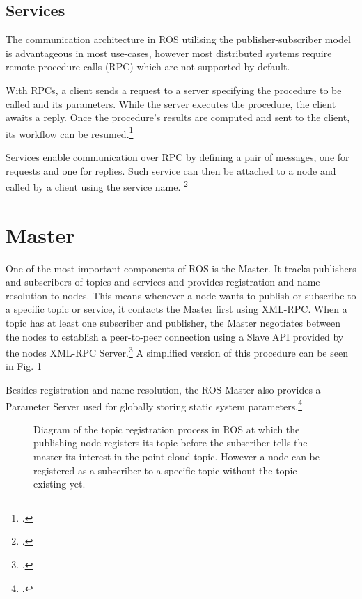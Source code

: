 \subsection{Services}
The communication architecture in ROS utilising the publisher-subscriber model is advantageous in most use-cases, however most distributed systems require remote procedure calls (RPC) which are not supported by default.

With RPCs, a client sends a request to a server specifying the procedure to be called and its parameters. While the server executes the procedure, the client awaits a reply. Once the procedure's results are computed and sent to the client, its workflow can be resumed.\footcite[Page 3]{rfc1831}

Services enable communication over RPC by defining a pair of messages, one for requests and one for replies. Such service can then be attached to a node and called by a client using the service name. \footcite{openSourceRoboticsFoundationServicesNodate}




\section{Master}
One of the most important components of ROS is the Master. It tracks publishers and subscribers of topics and services and provides registration and name resolution to nodes. This means whenever a node wants to publish or subscribe to a specific topic or service, it contacts the Master first using XML-RPC. When a topic has at least one subscriber and publisher, the Master negotiates between the nodes to establish a peer-to-peer connection using a Slave API provided by the nodes XML-RPC Server.\footcite{openSourceRoboticsFoundationMasterNodate} A simplified version of this procedure can be seen in Fig. \ref{fig:ros_master_reg}

Besides registration and name resolution, the ROS Master also provides a Parameter Server used for globally storing static system parameters.\footcite{openSourceRoboticsFoundationParameterServerNodate}
\begin{figure}[]
	\centering
	
	\caption{Diagram of the topic registration process in ROS at which the publishing node registers its topic before the subscriber tells the master its interest in the point-cloud topic. However a node can be registered as a subscriber to a specific topic without the topic existing yet.}
	\label{fig:ros_master_reg}
\end{figure}



